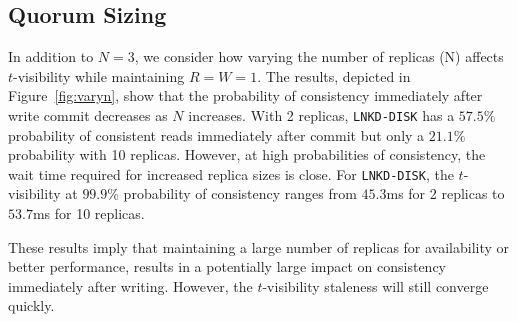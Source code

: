 \documentclass{vldb}
\newcommand{\subsectionskip}{-0em}
\begin{document}
\vspace{\subsectionskip}\subsection{Quorum Sizing}

In addition to $N$$=$$3$, we consider how varying the number of
replicas (N) affects $t$-visibility while maintaining
$R$$=$$W$$=$$1$. The results, depicted in Figure~\ref{fig:varyn}, show
that the probability of consistency immediately after write commit
decreases as $N$ increases.  With 2 replicas, \texttt{LNKD-DISK} has a
$57.5\%$ probability of consistent reads immediately after commit but
only a $21.1\%$ probability with 10 replicas.  However, at high
probabilities of consistency, the wait time required for increased
replica sizes is close.  For \texttt{LNKD-DISK}, the $t$-visibility at
$99.9\%$ probability of consistency ranges from $45.3$ms for 2
replicas to $53.7$ms for 10 replicas.

These results imply that maintaining a large number of replicas for
availability or better performance, results in a potentially large
impact on consistency immediately after writing. However, the
$t$-visibility staleness will still converge quickly.
\end{document}
